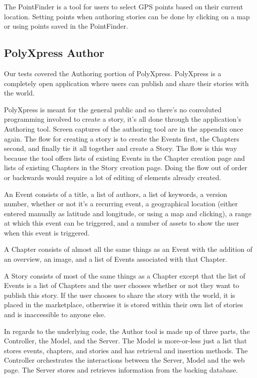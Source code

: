 \documentclass[12pt]{ucthesis}
\begin{document}
The PointFinder is a tool for users to select GPS points based on their current location. Setting points when authoring stories can be done by clicking on a map or using points saved in the PointFinder.

\subsection{PolyXpress Author}
Our tests covered the Authoring portion of PolyXpress. PolyXpress is a completely open application where users can publish and share their stories with the world. 

PolyXpress is meant for the general public and so there's no convoluted programming involved to create a story, it's all done through the application's Authoring tool. Screen captures of the authoring tool are in the appendix once again. The flow for creating a story is to create the Events first, the Chapters second, and finally tie it all together and create a Story. The flow is this way because the tool offers lists of existing Events in the Chapter creation page and lists of existing Chapters in the Story creation page. Doing the flow out of order or backwards would require a lot of editing of elements already created.

An Event consists of a title, a list of authors, a list of keywords, a version number, whether or not it's a recurring event, a geographical location (either entered manually as latitude and longitude, or using a map and clicking), a range at which this event can be triggered, and a number of assets to show the user when this event is triggered.

A Chapter consists of almost all the same things as an Event with the addition of an overview, an image, and a list of Events associated with that Chapter.

A Story consists of most of the same things as a Chapter except that the list of Events is a list of Chapters and the user chooses whether or not they want to publish this story. If the user chooses to share the story with the world, it is placed in the marketplace, otherwise it is stored within their own list of stories and is inaccessible to anyone else.

In regards to the underlying code, the Author tool is made up of three parts, the Controller, the Model, and the Server. The Model is more-or-less just a list that stores events, chapters, and stories and has retrieval and insertion methods. The Controller orchestrates the interactions between the Server, Model and the web page. The Server stores and retrieves information from the backing database.
\end{document}
